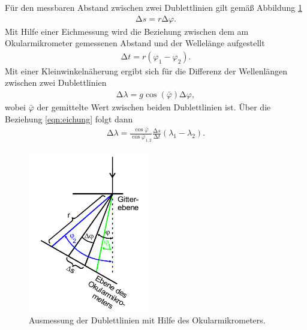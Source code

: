 Für den messbaren Abstand zwischen zwei Dublettlinien gilt gemäß Abbildung
\ref{fig:okular}
\begin{align}
  \increment s = r \increment \varphi.
  \label{eqn:okumess}
\end{align}
Mit Hilfe einer Eichmessung wird die Beziehung zwischen dem am Okularmikrometer
gemessenen Abstand und der Wellelänge aufgestellt
\begin{align}
  \increment t = r (\varphi_1 - \varphi_2).
  \label{eqn:eichung}
\end{align}
Mit einer Kleinwinkelnäherung ergibt sich für die Differenz der Wellenlängen
zwischen zwei Dublettlinien
\begin{align}
  \increment \lambda = g \cos(\bar{\varphi}) \increment \varphi,
\end{align}
wobei $\bar{\varphi}$ der gemittelte Wert zwischen beiden Dublettlinien ist.
Über die Beziehung \eqref{eqn:eichung} folgt dann
\begin{align}
  \increment \lambda = \frac{\cos \bar{\varphi}}{\cos \bar{\varphi}_{1,2}}
  \frac{\increment s}{\increment t} (\lambda_1 - \lambda_2).
\end{align}

\begin{figure}
  \centering
  \includegraphics[height = 7cm]{MeinFotoalbum:)/DublettsMessung.png}
  \caption{Ausmessung der Dublettlinien mit Hilfe des Okularmikrometers.
  \cite{anleitung}}
  \label{fig:okular}
\end{figure}

